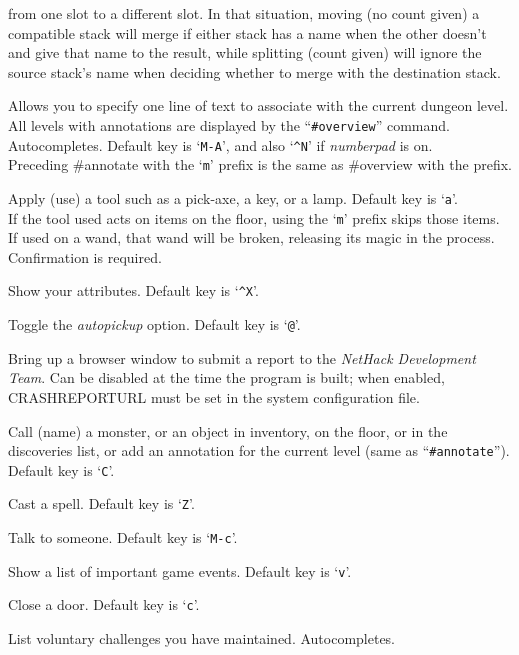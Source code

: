 \documentclass[titlepage]{article}
\begin{document}
\begin{description}[font=\mdseries\ttfamily]
from one slot to a different slot.  In that situation, moving (no
count given) a compatible stack will merge if either stack has a
name when the other doesn't and give that name to the result, while
splitting (count given) will ignore the source stack's name when
deciding whether to merge with the destination stack.
\item[\#annotate]
Allows you to specify one line of text to associate with the current
dungeon level.  All levels with annotations are displayed by the
``\texttt{\#overview}'' command. Autocompletes.
Default key is `\texttt{M-A}',
and also `\texttt{\textasciicircum N}' if \textit{number\textunderscore pad} is on.
\\
Preceding \#annotate with the `\texttt{m}' prefix is the same as
\#overview with the prefix.
\item[\#apply]
Apply (use) a tool such as a pick-axe, a key, or a lamp.
Default key is `\texttt{a}'.\\
If the tool used acts on items on the floor, using the `\texttt{m}' prefix
skips those items.\\
If used on a wand, that wand will be broken, releasing its magic in the
process.  Confirmation is required.
\item[\#attributes]
Show your attributes. Default key is `\texttt{\textasciicircum X}'.
\item[\#autopickup]
Toggle the \textit{autopickup} option. Default key is `\texttt{@}'.
\item[\#bugreport]
Bring up a browser window to submit a report to the \textit{NetHack Development
Team}.
Can be disabled at the time the program is built; when enabled,
CRASHREPORTURL must be set in the system configuration file.
\item[\#call]
Call (name) a monster, or an object in inventory, on the floor,
or in the discoveries list, or add an annotation for the
current level (same as ``\texttt{\#annotate}''). Default key is `\texttt{C}'.
\item[\#cast]
Cast a spell. Default key is `\texttt{Z}'.
\item[\#chat]
Talk to someone. Default key is `\texttt{M-c}'.
\item[\#chronicle]
Show a list of important game events. Default key is `\texttt{v}'.
\item[\#close]
Close a door. Default key is `\texttt{c}'.
\item[\#conduct]
List voluntary challenges you have maintained. Autocompletes.

\end{description}
\end{document}
